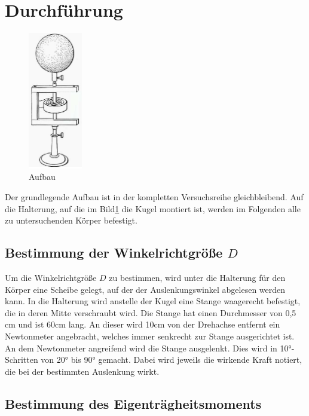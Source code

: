 \section{Durchführung}
\label{sec:Durchführung}

\begin{figure}
    \centering
    \includegraphics[height=6cm]{data/Bild_1.png}
    \caption{Aufbau}
    \label{fig:aufbau}
\end{figure}

Der grundlegende Aufbau ist in der kompletten Versuchsreihe gleichbleibend. Auf die Halterung, auf die im Bild\ref{fig:aufbau} die Kugel
montiert ist, werden im Folgenden alle zu untersuchenden Körper befestigt. 

\subsection{Bestimmung der Winkelrichtgröße $D$}

Um die Winkelrichtgröße $D$ zu bestimmen, wird unter die Halterung für den Körper eine Scheibe gelegt, auf der der Auslenkungswinkel 
abgelesen werden kann. In die Halterung wird anstelle der Kugel eine Stange waagerecht befestigt, die in deren Mitte verschraubt wird.
Die Stange hat einen Durchmesser von 0,5$\si{\centi\meter}$ und ist 60$\si{\centi\meter}$ lang. An dieser wird 10$\si{\centi\meter}$
von der Drehachse entfernt ein Newtonmeter angebracht, welches immer senkrecht zur Stange ausgerichtet ist. An dem Newtonmeter 
angreifend wird die Stange ausgelenkt. Dies wird in 10$\si{\degree}$-Schritten von 20$\si{\degree}$ bis 90$\si{\degree}$ gemacht.
Dabei wird jeweils die wirkende Kraft notiert, die bei der bestimmten Auslenkung wirkt. 

\subsection{Bestimmung des Eigenträgheitsmoments}

